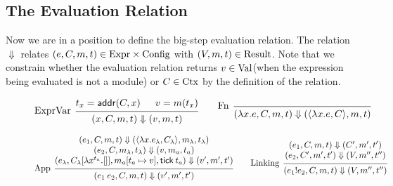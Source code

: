 \documentclass[acmsmall,screen,review]{acmart}
\theoremstyle{definition}
\newcommand*{\Expr}{\text{Expr}}
\newcommand*{\Time}{\mathbb{T}}
\newcommand*{\Ctx}[1]{\text{Ctx}\vphantom{#1}}
\newcommand*{\Value}[1]{\text{Val}\vphantom{#1}}
\newcommand*{\mem}{m}
\newcommand*{\Config}[1]{\text{Config}\vphantom{#1}}
\newcommand*{\Result}[1]{\text{Result}\vphantom{#1}}
\newcommand*{\link}[2]{{#1}\mathtt{!}{#2}}
\newcommand*{\addr}{\mathsf{addr}}
\newcommand*{\tick}{\mathsf{tick}}
\begin{document}
\subsection{The Evaluation Relation}

Now we are in a position to define the big-step evaluation relation.
The relation $\Downarrow$ relates $(e,C,\mem,t)\in\Expr\times\Config{\Time}$ with
$(V,\mem,t)\in\Result{\Time}$.
Note that we constrain whether the evaluation relation returns $v\in\Value{\Time}$(when the expression being evaluated is not a module) or $C\in\Ctx{\Time}$ by the definition of the relation.

\begin{figure}[htb]
  \footnotesize
  \[
    \begin{prooftree}
      \hypo{t_{x}=\addr(C,x)}
      \hypo{v=\mem(t_{x})}
      \infer[left label=ExprVar]2{
      (x, C, \mem, t)
      \Downarrow
      (v, \mem, t)
      }
    \end{prooftree}\qquad
    \begin{prooftree}
      \infer[left label=Fn]0{
      (\lambda x.e, C, \mem, t)
      \Downarrow
      (\langle\lambda x.e, C\rangle, \mem, t)
      }
    \end{prooftree}
  \]

  \[
    \begin{prooftree}
      \hypo{
        \begin{matrix}
          (e_{1}, C, \mem, t)
          \Downarrow
          (\langle\lambda x.e_{\lambda}, C_{\lambda}\rangle, \mem_{\lambda}, t_{\lambda}) \\
          (e_{2}, C, \mem_{\lambda}, t_{\lambda})
          \Downarrow
          (v, \mem_{a}, t_{a})                                                            \\
          (e_{\lambda}, C_{\lambda}[\lambda x^{t_{a}}.[]], \mem_{a}[t_{a}\mapsto v], \tick\:t_{a})
          \Downarrow
          (v', \mem',t')
        \end{matrix}
      }
      \infer[left label={App}]1{
      (e_{1}\:e_{2}, C, \mem, t)
      \Downarrow
      (v', \mem',t')
      }
    \end{prooftree}\qquad
    \begin{prooftree}
      \hypo{
        \begin{matrix}
          (e_{1}, C, \mem, t)
          \Downarrow
          (C', \mem', t') \\
          (e_{2}, C', \mem', t')
          \Downarrow
          (V, \mem'', t'')
        \end{matrix}
      }
      \infer[left label=Linking]1{
      (\link{e_{1}}{e_{2}}, C, \mem, t)
      \Downarrow
      (V, \mem'', t'')
      }
    \end{prooftree}
  \]


\end{figure}
\end{document}
